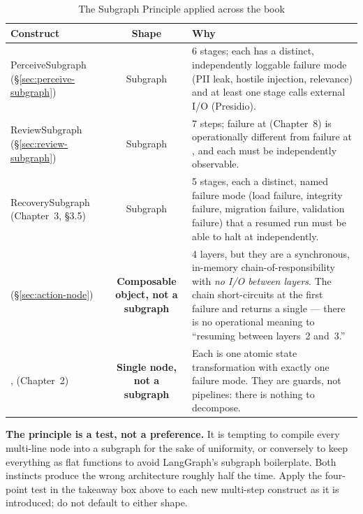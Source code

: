 \begin{table}[htbp]
\centering
\caption{The Subgraph Principle applied across the book}
\label{tab:subgraph-examples}
\renewcommand{\arraystretch}{1.5}
\begin{tabularx}{\linewidth}{@{} l c P{6.0cm} @{}}
\toprule
\textbf{Construct} & \textbf{Shape} & \textbf{Why} \\
\midrule
PerceiveSubgraph (§\ref{sec:perceive-subgraph})
  & Subgraph & 6 stages; each has a distinct, independently loggable
    failure mode (PII leak, hostile injection, relevance) and at least
    one stage calls external I/O (Presidio). \\
ReviewSubgraph (§\ref{sec:review-subgraph})
  & Subgraph & 7 steps; failure at  (Chapter~8)
    is operationally different from failure at
    , and each must be independently
    observable. \\
RecoverySubgraph (Chapter~3, §3.5)
  & Subgraph & 5 stages, each a distinct, named failure mode
    (load failure, integrity failure, migration failure, validation
    failure) that a resumed run must be able to halt at independently. \\
\midrule
{} (§\ref{sec:action-node})
  & \textbf{Composable object, not a subgraph}
  & 4 layers, but they are a synchronous, in-memory
    chain-of-responsibility with \emph{no I/O between layers}.  The
    chain short-circuits at the first failure and returns a single
     --- there is no operational meaning to
    ``resuming between layers~2 and~3.'' \\
,
(Chapter~2)
  & \textbf{Single node, not a subgraph}
  & Each is one atomic state transformation with exactly one failure
    mode.  They are guards, not pipelines: there is nothing to
    decompose. \\
\bottomrule
\end{tabularx}
\end{table}

\begin{warningbox}
\textbf{The principle is a test, not a preference.}  It is tempting to
compile every multi-line node into a subgraph for the sake of
uniformity, or conversely to keep everything as flat functions to avoid
LangGraph's subgraph boilerplate.  Both instincts produce the wrong
architecture roughly half the time.  Apply the four-point test in the
takeaway box above to each new multi-step construct as it is introduced;
do not default to either shape.
\end{warningbox}

